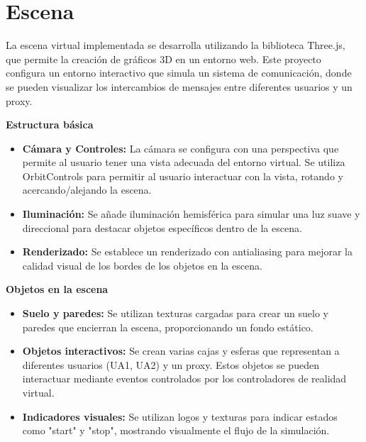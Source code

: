 \documentclass[a4paper, 12pt]{book}
\begin{document}
\section{Escena} 
\label{sec:escena}

La escena virtual implementada se desarrolla utilizando la biblioteca Three.js, 
que permite la creación de gráficos 3D en un entorno web. Este proyecto configura un entorno interactivo 
que simula un sistema de comunicación, donde se pueden visualizar los intercambios de mensajes entre diferentes usuarios y un proxy.

\textbf{Estructura básica}

\begin{itemize}
  \item \textbf{Cámara y Controles:} La cámara se configura con una perspectiva que permite al usuario tener una vista adecuada del entorno virtual. 
  Se utiliza OrbitControls para permitir al usuario interactuar con la vista, rotando y acercando/alejando la escena.
  
  \item \textbf{Iluminación:} Se añade iluminación hemisférica para simular una luz suave y direccional 
  para destacar objetos específicos dentro de la escena.

  \item \textbf{Renderizado:} Se establece un renderizado con antialiasing para mejorar la calidad visual de los bordes de los objetos en la escena.
  
\end{itemize}

\textbf{Objetos en la escena}

\begin{itemize}
  \item \textbf{Suelo y paredes:} Se utilizan texturas cargadas para crear un suelo y paredes que encierran la escena, proporcionando un fondo estático.
  
  \item \textbf{Objetos interactivos:} Se crean varias cajas y esferas que representan a diferentes usuarios (UA1, UA2) y un proxy. 
  Estos objetos se pueden interactuar mediante eventos controlados por los controladores de realidad virtual.

  \item \textbf{Indicadores visuales:} Se utilizan logos y texturas para indicar estados como "start" y "stop", mostrando visualmente el flujo de la simulación.
  
\end{itemize}
\end{document}
